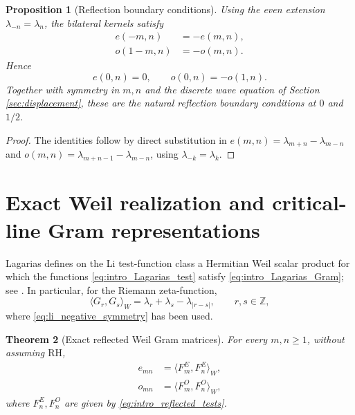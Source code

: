 \documentclass[11pt]{amsart}
\numberwithin{equation}{section}
\theoremstyle{plain}
\newtheorem{theorem}{Theorem}[section]
\newtheorem{proposition}[theorem]{Proposition}
\theoremstyle{definition}
\theoremstyle{remark}
\newcommand{\RH}{\mathrm{RH}}
\begin{document}
\begin{proposition}[Reflection boundary conditions]
\label{prop:reflection_boundary_conditions}
Using the even extension $\lambda_{-n}=\lambda_n$, the bilateral kernels satisfy
\begin{align}
e(-m,n)&=-e(m,n),
\label{eq:E_reflection_oddness}\\
o(1-m,n)&=-o(m,n).
\label{eq:O_reflection_oddness}
\end{align}
Hence
\begin{equation}
e(0,n)=0,
\qquad
o(0,n)=-o(1,n).
\label{eq:reflection_boundary_values}
\end{equation}
Together with symmetry in $m,n$ and the discrete wave equation of Section \ref{sec:displacement}, these are the natural reflection boundary conditions at $0$ and $1/2$.
\end{proposition}

\begin{proof}
The identities follow by direct substitution in
$e(m,n)=\lambda_{m+n}-\lambda_{m-n}$ and
$o(m,n)=\lambda_{m+n-1}-\lambda_{m-n}$, using $\lambda_{-k}=\lambda_k$.
\end{proof}

\section{Exact Weil realization and critical-line Gram representations}
\label{sec:gram_criterion}

Lagarias defines on the Li test-function class a Hermitian Weil scalar product for which the functions \eqref{eq:intro_Lagarias_test} satisfy \eqref{eq:intro_Lagarias_Gram}; see \cite[Section~3, Theorem~3.1]{Lagarias2007}. In particular, for the Riemann zeta-function,
\begin{equation}
\langle G_r,G_s\rangle_W
=\lambda_r+\lambda_s-\lambda_{|r-s|},
\qquad r,s\in\mathbb Z,
\label{eq:Lagarias_kernel_zeta}
\end{equation}
where \eqref{eq:li_negative_symmetry} has been used.

\begin{theorem}[Exact reflected Weil Gram matrices]
\label{thm:exact_Weil_reflection}
For every $m,n\ge1$, without assuming $\RH$,
\begin{align}
e_{mn}
&=\langle F_m^E,F_n^E\rangle_W,
\label{eq:E_exact_Weil_Gram}\\
o_{mn}
&=\langle F_m^O,F_n^O\rangle_W,
\label{eq:O_exact_Weil_Gram}
\end{align}
where $F_n^E,F_n^O$ are given by \eqref{eq:intro_reflected_tests}.
\end{theorem}
\end{document}
